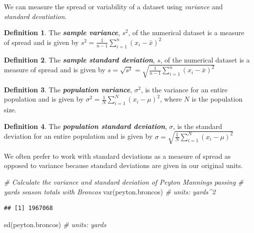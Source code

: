 \documentclass[
  11pt,
]{book}
\newenvironment{Shaded}{\begin{snugshade}}{\end{snugshade}}
\newcommand{\CommentTok}[1]{\textcolor[rgb]{0.56,0.35,0.01}{\textit{#1}}}
\newcommand{\FunctionTok}[1]{\textcolor[rgb]{0.00,0.00,0.00}{#1}}
\newcommand{\NormalTok}[1]{#1}
\theoremstyle{definition}
\newtheorem{definition}{Definition}[chapter]
\theoremstyle{definition}
\theoremstyle{definition}
\theoremstyle{definition}
\theoremstyle{remark}
\begin{document}
We can measure the spread or variability of a dataset using \emph{variance} and \emph{standard devatiation}.

\begin{definition}
The \textbf{\emph{sample variance}}, \(s^2\), of the numerical dataset is a measure of spread and is given by \(s^2 = \frac{1}{n-1}\sum_{i=1}^n (x_i - \bar{x})^2\)
\end{definition}

\begin{definition}
The \textbf{\emph{sample standard deviation}}, \(s\), of the numerical dataset is a measure of spread and is given by \(s = \sqrt{s^2} = \sqrt{\frac{1}{n-1}\sum_{i=1}^n (x_i - \bar{x})^2}\)
\end{definition}

\begin{definition}
The \textbf{\emph{population variance}}, \(\sigma^2\), is the variance for an entire population and is given by \(\sigma^2 = \frac{1}{N} \sum_{i=1}^N (x_i - \mu)^2\), where \(N\) is the population size.
\end{definition}

\begin{definition}
The \textbf{\emph{population standard deviation}}, \(\sigma\), is the standard deviation for an entire population and is given by \(\sigma = \sqrt{\frac{1}{N} \sum_{i=1}^N (x_i - \mu)^2}\)
\end{definition}

We often prefer to work with standard deviations as a measure of spread as opposed to variance because standard deviations are given in our original units.

\begin{Shaded}
\begin{Highlighting}[]
\CommentTok{\# Calculate the variance and standard deviation of Peyton Manning\textquotesingle{}s passing }
\CommentTok{\# yards season totals with Broncos}
\FunctionTok{var}\NormalTok{(peyton.broncos) }\CommentTok{\# units: yards\^{}2}
\end{Highlighting}
\end{Shaded}

\begin{verbatim}
## [1] 1967068
\end{verbatim}

\begin{Shaded}
\begin{Highlighting}[]
\FunctionTok{sd}\NormalTok{(peyton.broncos) }\CommentTok{\# units: yards}
\end{Highlighting}
\end{Shaded}
\end{document}
